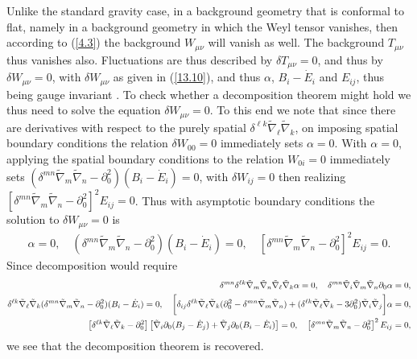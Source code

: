 \documentclass[aps,onecolumn,10pt]{revtex4}
\numberwithin{equation}{section}
\numberwithin{equation}{section}
\begin{document}
Unlike the standard gravity case, in a background geometry that is conformal to flat, namely in a background geometry in which the Weyl tensor vanishes,  then according to (\ref{4.3}) the background $W_{\mu\nu}$ will vanish as well. The background $T_{\mu\nu}$ thus vanishes also. Fluctuations are thus described by $\delta T_{\mu\nu}=0$, and thus by $\delta W_{\mu\nu}=0$, with $\delta W_{\mu\nu}$ as given in (\ref{13.10}), and thus $\alpha$, $B_i-\dot{E}_i$ and $E_{ij}$,  thus being gauge invariant  \cite{footnote11}. To check whether a decomposition theorem might hold we thus need to solve the equation $\delta W_{\mu\nu}=0$. To this end we note that since there are derivatives with respect to the purely spatial $\delta^{\ell k}\tilde{\nabla}_{\ell}\tilde{\nabla}_k$, on imposing spatial boundary conditions the relation $\delta W_{00}=0$ immediately sets $\alpha=0$.  With $\alpha=0$, applying the spatial boundary conditions to the relation $W_{0i}=0$ immediately sets $(\delta^{mn}\tilde{\nabla}_m\tilde{\nabla}_n-\partial_0^2)(B_i - \dot{E}_i)=0$, with $\delta W_{ij}=0$ then realizing $\left[\delta^{mn}\tilde{\nabla}_m\tilde{\nabla}_n-\partial_0^2\right]^2E_{ij}=0$. Thus with asymptotic boundary conditions the solution to $\delta W_{\mu\nu}=0$ is
%
\begin{eqnarray}
\alpha=0,\quad (\delta^{mn}\tilde{\nabla}_m\tilde{\nabla}_n-\partial_0^2)(B_i - \dot{E}_i)=0,\quad \left[\delta^{mn}\tilde{\nabla}_m\tilde{\nabla}_n-\partial_0^2\right]^2E_{ij}=0.
\label{13.11}
\end{eqnarray}
%
Since decomposition would require
%
\begin{align}
\delta^{mn}\delta^{\ell k}\tilde{\nabla}_m\tilde{\nabla}_n\tilde{\nabla}_{\ell}\tilde{\nabla}_k \alpha=0, \quad  \delta^{mn}\tilde{\nabla}_i\tilde{\nabla}_m\tilde{\nabla}_n\partial_0\alpha&=0,
\nonumber\\
\delta^{\ell k}\tilde{\nabla}_{\ell}\tilde{\nabla}_k(\delta^{mn}\tilde{\nabla}_m\tilde{\nabla}_n-\partial_0^2)(B_i - \dot{E}_i)=0,\quad
\bigg{[} \delta_{ij}\delta^{\ell k}\tilde{\nabla}_{\ell}\tilde{\nabla}_k (\partial_0^2 - \delta^{mn}\tilde{\nabla}_m\tilde{\nabla}_n) 
+(\delta^{\ell k}\tilde{\nabla}_{\ell}\tilde{\nabla}_k -3\partial_0^2)\tilde{\nabla}_i\tilde{\nabla}_j  
\bigg{] }\alpha&=0,
\nonumber\\
\left[\delta^{\ell k}\tilde{\nabla}_{\ell}\tilde{\nabla}_k -\partial_0^2\right]\left[\tilde{\nabla}_i   \partial_0(B_j - \dot{E}_j)+ \tilde{\nabla}_j \partial_0(B_i - \dot{E}_i)\right]=0,\quad \left[\delta^{mn}\tilde{\nabla}_m\tilde{\nabla}_n-\partial_0^2\right]^2E_{ij}&=0,
\label{13.12}
\end{align}
%
we see that the decomposition theorem is recovered.
\end{document}
